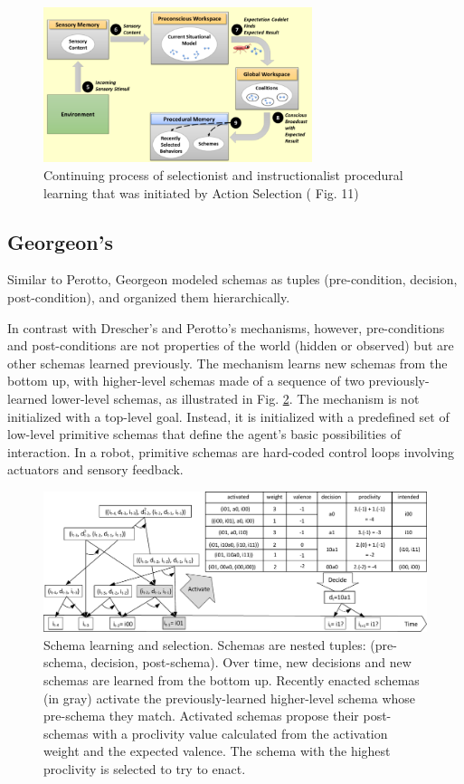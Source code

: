 \documentclass[runningheads]{llncs}
\begin{document}
\begin{figure}
	\centering
	\includegraphics[width=0.7\textwidth]{Figure_LIDA2.png}
	\caption{Continuing process of selectionist and instructionalist procedural learning that was initiated by Action Selection (\cite{kugele_learning_2021} Fig. 11)} 
	\label{fig:lida2}
\end{figure}


\subsection{Georgeon's}

Similar to Perotto, Georgeon modeled schemas as tuples (pre-condition, decision, post-condition), and organized them  hierarchically. 

In contrast with Drescher's and Perotto's mechanisms, however, pre-conditions and post-conditions are not properties of the world (hidden or observed) but are other schemas learned previously. 
The mechanism learns new schemas from the bottom up, with higher-level schemas made of a sequence of two previously-learned lower-level schemas, 
as illustrated in Fig. \ref{fig:agent8}. 
The mechanism is not initialized with a top-level goal. 
Instead, it is initialized with a predefined set of low-level primitive schemas that define the agent's basic possibilities of interaction. 
In a robot, primitive schemas are hard-coded control loops involving actuators and sensory feedback. 


\begin{figure}
	\centering
	\includegraphics[width=1.0\textwidth]{Figure_3_agent8.pdf}
	\caption{Schema learning and selection.
		Schemas are nested tuples: (pre-schema, decision, post-schema).
		Over time, new decisions and new schemas are learned from the bottom up. 
		Recently enacted schemas (in gray) activate the previously-learned higher-level schema whose pre-schema they match.
		Activated schemas propose their post-schemas with a proclivity value calculated from the activation weight and the expected valence.
		The schema with the highest proclivity is selected to try to enact.} 
	\label{fig:agent8}
\end{figure}
\end{document}
